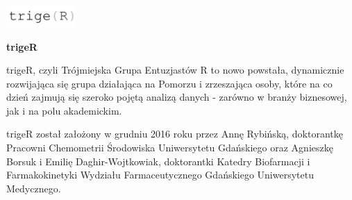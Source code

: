 \documentclass[\main/boa.tex]{subfiles}
\begin{document}
	
	\begin{minipage}[t]{0.915\textwidth}
		\center     
		\includegraphics[width=100px]{img/logos.bw/triger3.png} 
	\end{minipage}
	
	\Large \textbf {trigeR}
	
	
	\vskip 0.3cm
	\normalsize 


trigeR, czyli Trójmiejska Grupa Entuzjastów R to nowo powstała, dynamicznie rozwijająca się grupa działająca na Pomorzu i zrzeszająca osoby, które na co dzień zajmują się szeroko pojętą analizą danych - zarówno w branży biznesowej, jak i na polu akademickim.

trigeR został założony w grudniu 2016 roku przez Annę Rybińską, doktorantkę Pracowni Chemometrii Środowiska Uniwersytetu Gdańskiego oraz Agnieszkę Borsuk i Emilię Daghir-Wojtkowiak, doktorantki Katedry Biofarmacji i Farmakokinetyki Wydziału Farmaceutycznego Gdańskiego Uniwersytetu Medycznego.
	
\end{document}
